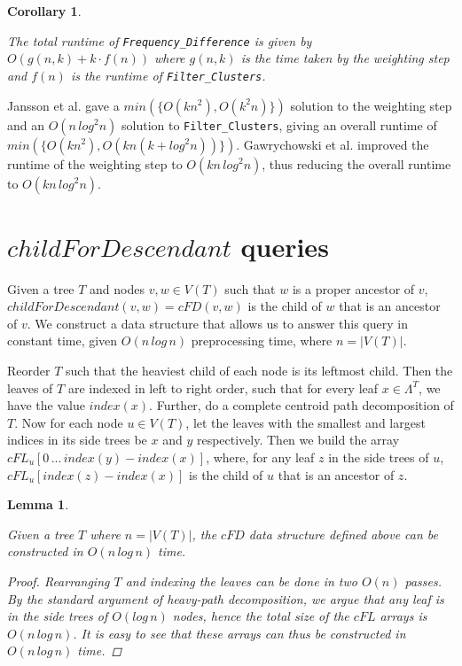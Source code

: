 \documentclass{article}
\newcommand{\leafset}{\Lambda}
\newtheorem{freqdiffruntimecomponents}[incompatibility]{Corollary}
\newtheorem{cfddatastructure}[incompatibility]{Lemma}
\begin{document}
    \begin{freqdiffruntimecomponents}
        \label{cor:freqdiffruntimecomponents}

        The total runtime of \texttt{Frequency\_Difference} is given by $O(g(n, k) + k \cdot f(n))$ where $g(n, k)$ is the time taken by the weighting step and $f(n)$ is the runtime of \texttt{Filter\_Clusters}.
    \end{freqdiffruntimecomponents}

    Jansson et al. \cite{jansson2018algorithms} gave a $min(\{O(kn^2), O(k^2n)\})$ solution to the weighting step and an $O(n\,log^2n)$ solution to \texttt{Filter\_Clusters}, giving an overall runtime of $min(\{O(kn^2), O(kn(k + log^2n))\})$. Gawrychowski et al. \cite{gawrychowski2017faster} improved the runtime of the weighting step to $O(kn\,log^2n)$, thus reducing the overall runtime to $O(kn\,log^2n)$.

    \section{$childForDescendant$ queries}
    \label{sec:cfd}

    Given a tree $T$ and nodes $v, w \in V(T)$ such that $w$ is a proper ancestor of $v$, $childForDescendant(v, w) = cFD(v, w)$ is the child of $w$ that is an ancestor of $v$. We construct a data structure that allows us to answer this query in constant time, given $O(n\,log\,n)$ preprocessing time, where $n = |V(T)|$.

    Reorder $T$ such that the heaviest child of each node is its leftmost child. Then the leaves of $T$ are indexed in left to right order, such that for every leaf $x \in \leafset^T$, we have the value $index(x)$. Further, do a complete centroid path decomposition of $T$. Now for each node $u \in V(T)$, let the leaves with the smallest and largest indices in its side trees be $x$ and $y$ respectively. Then we build the array $cFL_u[0\, ...\, index(y) - index(x)]$, where, for any leaf $z$ in the side trees of $u$, $cFL_u[index(z) - index(x)]$ is the child of $u$ that is an ancestor of $z$.
    \newline

    \begin{cfddatastructure}
        \label{lem:cfddatastructure}

        Given a tree $T$ where $n = |V(T)|$, the $cFD$ data structure defined above can be constructed in $O(n\,log\,n)$ time.

        \begin{proof}
            Rearranging $T$ and indexing the leaves can be done in two $O(n)$ passes. By the standard argument of heavy-path decomposition, we argue that any leaf is in the side trees of $O(log\,n)$ nodes, hence the total size of the $cFL$ arrays is $O(n\,log\,n)$. It is easy to see that these arrays can thus be constructed in $O(n\,log\,n)$ time.
        \end{proof}
    \end{cfddatastructure}
\end{document}
